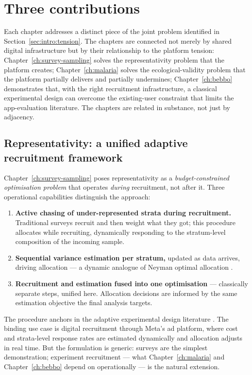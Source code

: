 \section{Three contributions}
\label{sec:intro:contributions}

Each chapter addresses a distinct piece of the joint problem identified in Section~\ref{sec:intro:tension}. The chapters are connected not merely by shared digital infrastructure but by their relationship to the platform tension: Chapter~\ref{ch:survey-sampling} solves the representativity problem that the platform creates; Chapter~\ref{ch:malaria} solves the ecological-validity problem that the platform partially delivers and partially undermines; Chapter~\ref{ch:bebbo} demonstrates that, with the right recruitment infrastructure, a classical experimental design can overcome the existing-user constraint that limits the app-evaluation literature. The chapters are related in substance, not just by adjacency.

\subsection{Representativity: a unified adaptive recruitment framework}
\label{sec:intro:ch1}

Chapter~\ref{ch:survey-sampling} poses representativity as a \emph{budget-constrained optimisation problem} that operates \emph{during} recruitment, not after it. Three operational capabilities distinguish the approach:

\begin{enumerate}[leftmargin=*]
    \item \textbf{Active chasing of under-represented strata during recruitment.} Traditional surveys recruit and then weight what they got; this procedure allocates while recruiting, dynamically responding to the stratum-level composition of the incoming sample.
    \item \textbf{Sequential variance estimation per stratum,} updated as data arrives, driving allocation --- a dynamic analogue of Neyman optimal allocation \citep{Neyman1934}.
    \item \textbf{Recruitment and estimation fused into one optimisation} --- classically separate steps, unified here. Allocation decisions are informed by the same estimation objective the final analysis targets.
\end{enumerate}

The procedure anchors in the adaptive experimental design literature \citep{Kasy2021,Caria2020,Carneiro2020}. The binding use case is digital recruitment through Meta's ad platform, where cost and strata-level response rates are estimated dynamically and allocation adjusts in real time. But the formulation is generic: surveys are the simplest demonstration; experiment recruitment --- what Chapter~\ref{ch:malaria} and Chapter~\ref{ch:bebbo} depend on operationally --- is the natural extension.

